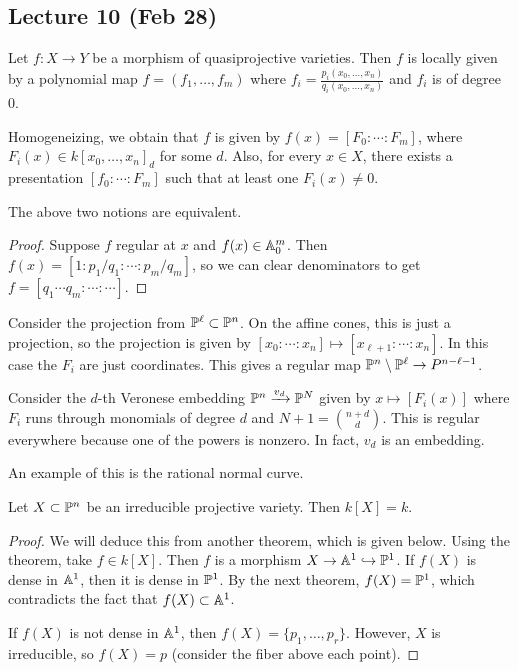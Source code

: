 \documentclass[twoside, 10pt]{article}
\begin{document}
    \subsection{Lecture 10 (Feb 28)}
Let $f:X \to Y$ be a morphism of quasiprojective varieties. Then $f$ is locally given by a polynomial map $f = (f_1, \ldots, f_m)$ where $f_i = \frac{p_i(x_0, \ldots, x_n)}{q_i(x_0, \ldots, x_n)}$ and $f_i$ is of degree $0$.

    Homogeneizing, we obtain that $f$ is given by $f(x) = [F_0:\cdots:F_m]$, where $F_i(x) \in k[x_0, \ldots, x_n]_d$ for some $d$. Also, for every $x \in X$, there exists a presentation $[f_0:\cdots:F_m]$ such that at least one $F_i(x) \neq 0$.

    \begin{prop}
        The above two notions are equivalent.
        \begin{proof}
            Suppose $f$ regular at $x$ and $f(x) \in \A^m_0$. Then $f(x) = [1:p_1/q_1:\cdots:p_m/q_m]$, so we can clear denominators to get $f = [q_1\cdots q_m:\cdots:\cdots]$.
        \end{proof}
    \end{prop}

    \begin{exm}
        Consider the projection from $\P^{\ell} \subset \P^n$. On the affine cones, this is just a projection, so the projection is given by $[x_0:\cdots:x_n] \mapsto [x_{\ell+1}:\cdots:x_n]$. In this case the $F_i$ are just coordinates. This gives a regular map $\P^n \setminus \P^{\ell} \to P^{n-\ell - 1}$.
    \end{exm}
    
    \begin{exm}
        Consider the $d$-th Veronese embedding $\P^n \xrightarrow{v_d} \P^N$ given by $x \mapsto [F_i(x)]$ where $F_i$ runs through monomials of degree $d$ and $N+1 = \binom{n+d}{d}$. This is regular everywhere because one of the powers is nonzero. In fact, $v_d$ is an embedding.

        An example of this is the rational normal curve.
    \end{exm}

    \begin{thm}
        Let $X \subset \P^n$ be an irreducible projective variety. Then $k[X] = k$.
        \begin{proof}
            We will deduce this from another theorem, which is given below. Using the theorem, take $f \in k[X]$. Then $f$ is a morphism $X \to \A^1 \hookrightarrow \P^1$. If $f(X)$ is dense in $\A^1$, then it is dense in $\P^1$. By the next theorem, $f(X) = \P^1$, which contradicts the fact that $f(X) \subset \A^1$. 

            If $f(X)$ is not dense in $\A^1$, then $f(X) = \{p_1, \ldots, p_r\}$. However, $X$ is irreducible, so $f(X) = p$ (consider the fiber above each point).
        \end{proof}
    \end{thm}
\end{document}
